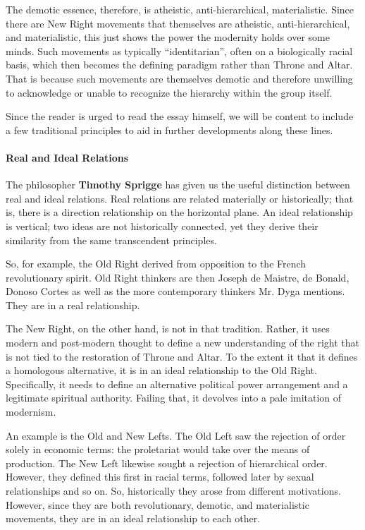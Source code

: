 The demotic essence, therefore, is atheistic, anti-hierarchical, materialistic. Since there are New Right movements that themselves are atheistic, anti-hierarchical, and materialistic, this just shows the power the modernity holds over some minds. Such movements as typically ``identitarian'', often on a biologically racial basis, which then becomes the defining paradigm rather than Throne and Altar. That is because such movements are themselves demotic and therefore unwilling to acknowledge or unable to recognize the hierarchy within the group itself.

Since the reader is urged to read the essay himself, we will be content to include a few traditional principles to aid in further developments along these lines.


\paragraph{Real and Ideal Relations}

The philosopher \textbf{Timothy Sprigge} has given us the useful distinction between real and ideal relations. Real relations are related materially or historically; that is, there is a direction relationship on the horizontal plane. An ideal relationship is vertical; two ideas are not historically connected, yet they derive their similarity from the same transcendent principles.

So, for example, the Old Right derived from opposition to the French revolutionary spirit. Old Right thinkers are then Joseph de Maistre, de Bonald, Donoso Cortes as well as the more contemporary thinkers Mr. Dyga mentions. They are in a real relationship.

The New Right, on the other hand, is not in that tradition. Rather, it uses modern and post-modern thought to define a new understanding of the right that is not tied to the restoration of Throne and Altar. To the extent it that it defines a homologous alternative, it is in an ideal relationship to the Old Right. Specifically, it needs to define an alternative political power arrangement and a legitimate spiritual authority. Failing that, it devolves into a pale imitation of modernism.

An example is the Old and New Lefts. The Old Left saw the rejection of order solely in economic terms: the proletariat would take over the means of production. The New Left likewise sought a rejection of hierarchical order. However, they defined this first in racial terms, followed later by sexual relationships and so on. So, historically they arose from different motivations. However, since they are both revolutionary, demotic, and materialistic movements, they are in an ideal relationship to each other.

